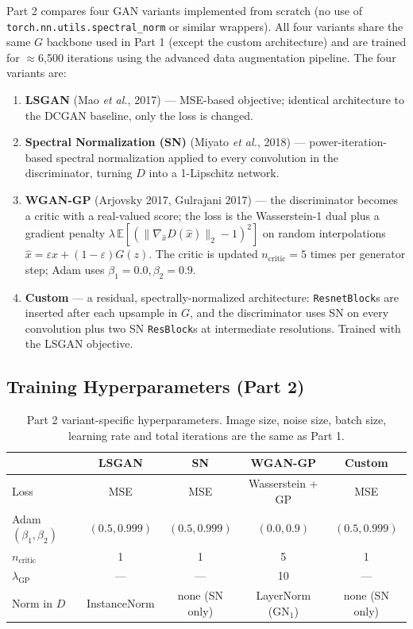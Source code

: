 \documentclass[11pt]{article}
\begin{document}
Part 2 compares four GAN variants implemented from scratch (no use of
\texttt{torch.nn.utils.spectral\_norm} or similar wrappers). All four variants
share the same $G$ backbone used in Part 1 (except the custom architecture) and
are trained for $\approx$6{,}500 iterations using the advanced data
augmentation pipeline. The four variants are:
\begin{enumerate}
    \item \textbf{LSGAN} (Mao \emph{et al.}, 2017) — MSE-based objective;
    identical architecture to the DCGAN baseline, only the loss is changed.
    \item \textbf{Spectral Normalization (SN)} (Miyato \emph{et al.}, 2018) —
    power-iteration-based spectral normalization applied to every convolution
    in the discriminator, turning $D$ into a 1-Lipschitz network.
    \item \textbf{WGAN-GP} (Arjovsky 2017, Gulrajani 2017) — the discriminator
    becomes a critic with a real-valued score; the loss is the Wasserstein-1
    dual plus a gradient penalty $\lambda\,\mathbb{E}[(\|\nabla_{\hat x}
    D(\hat x)\|_2 - 1)^2]$ on random interpolations $\hat x=\varepsilon
    x+(1-\varepsilon)G(z)$. The critic is updated $n_\text{critic}{=}5$ times
    per generator step; Adam uses $\beta_1{=}0.0,\beta_2{=}0.9$.
    \item \textbf{Custom} — a residual, spectrally-normalized architecture:
    \texttt{ResnetBlock}s are inserted after each upsample in $G$, and the
    discriminator uses SN on every convolution plus two SN \texttt{ResBlock}s
    at intermediate resolutions. Trained with the LSGAN objective.
\end{enumerate}

\subsection{Training Hyperparameters (Part 2)}
\begin{table}[H]
\centering
\begin{tabular}{lcccc}
\toprule
 & LSGAN & SN & WGAN-GP & Custom \\
\midrule
Loss     & MSE & MSE & Wasserstein + GP & MSE \\
Adam $(\beta_1,\beta_2)$ & $(0.5,0.999)$ & $(0.5,0.999)$ & $(0.0,0.9)$ & $(0.5,0.999)$ \\
$n_\text{critic}$ & 1 & 1 & 5 & 1 \\
$\lambda_\text{GP}$ & — & — & 10 & — \\
Norm in $D$ & InstanceNorm & none (SN only) & LayerNorm (GN$_1$)\footnotemark & none (SN only) \\
\bottomrule
\end{tabular}
\caption{Part 2 variant-specific hyperparameters. Image size, noise size,
batch size, learning rate and total iterations are the same as Part 1.}
\end{table}
\end{document}
